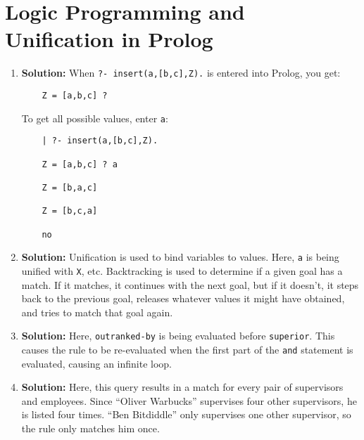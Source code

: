 \documentclass{article}
\begin{document}
\section{Logic Programming and Unification in Prolog}
\begin{enumerate}
    \item \textbf{Solution:} When \texttt{?- insert(a,[b,c],Z).} is entered into Prolog, you get:
    \begin{verbatim}
    Z = [a,b,c] ? 
    \end{verbatim}
    \vspace{-1em}
    To get all possible values, enter \texttt{a}:
    \begin{verbatim}
    | ?- insert(a,[b,c],Z).

    Z = [a,b,c] ? a

    Z = [b,a,c]

    Z = [b,c,a]

    no
    \end{verbatim}
    \vspace{-1em}
    \item \textbf{Solution:} Unification is used to bind variables to values. Here, \texttt{a} is being unified with \texttt{X}, etc. Backtracking is used to determine if a given goal has a match. If it matches, it continues with the next goal, but if it doesn't, it steps back to the previous goal, releases whatever values it might have obtained, and tries to match that goal again.
    \item \textbf{Solution:} Here, \texttt{outranked-by} is being evaluated before \texttt{superior}. This causes the rule to be re-evaluated when the first part of the \texttt{and} statement is evaluated, causing an infinite loop.
    \item \textbf{Solution:} Here, this query results in a match for every pair of supervisors and employees. Since ``Oliver Warbucks'' supervises four other supervisors, he is listed four times. ``Ben Bitdiddle'' only supervises one other supervisor, so the rule only matches him once.
\end{enumerate}
\end{document}
